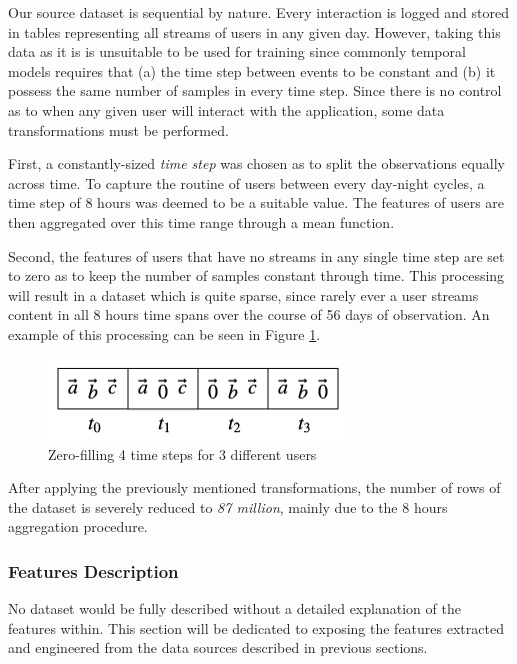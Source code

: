 \documentclass{kththesis}
\begin{document}
Our source dataset is sequential by nature. Every interaction is logged and stored in tables representing all streams of users in any given day. However, taking this data as it is is unsuitable to be used for training since commonly temporal models requires that (a) the time step between events to be constant and (b) it possess the same number of samples in every time step. Since there is no control as to when any given user will interact with the application, some data transformations must be performed. 

First, a constantly-sized \emph{time step} was chosen as to split the observations equally across time. To capture the routine of users between every day-night cycles, a time step of 8 hours was deemed to be a suitable value. The features of users are then aggregated over this time range through a mean function. 

Second, the features of users that have no streams in any single time step are set to zero as to keep the number of samples constant through time. This processing will result in a dataset which is quite sparse, since rarely ever a user streams content in all 8 hours time spans over the course of 56 days of observation. An example of this processing can be seen in Figure \ref{fig:zerofill}.

	\begin{figure}[h]
    \centering
    \includegraphics[width=0.7\textwidth, natwidth=580bp, natheight=313bp]{figures/zero_fill.png}
    \caption{Zero-filling 4 time steps for 3 different users}
    \label{fig:zerofill}
	\end{figure}

After applying the previously mentioned transformations, the number of rows of the dataset is severely reduced to \emph{87 million}, mainly due to the 8 hours aggregation procedure.


\subsubsection{Features Description}

No dataset would be fully described without a detailed explanation of the features within. This section will be dedicated to exposing the features extracted and engineered from the data sources described in previous sections.
\end{document}

